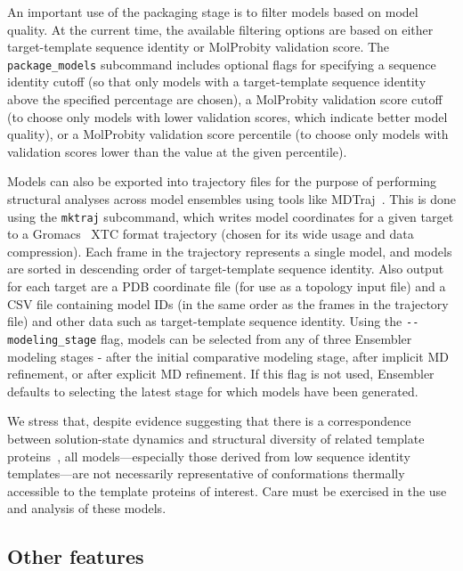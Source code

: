 \documentclass[10pt,letterpaper]{article}
\begin{document}
An important use of the packaging stage is to filter models based on model quality.
At the current time, the available filtering options are based on either target-template sequence identity or MolProbity validation score.
The {\tt package\_models} subcommand includes optional flags for specifying a sequence identity cutoff (so that only models with a target-template sequence identity above the specified percentage are chosen), a MolProbity validation score cutoff (to choose only models with lower validation scores, which indicate better model quality), or a MolProbity validation score percentile (to choose only models with validation scores lower than the value at the given percentile).

Models can also be exported into trajectory files for the purpose of performing structural analyses across model ensembles using tools like MDTraj~\cite{mdtraj}.
This is done using the {\tt mktraj} subcommand, which writes model coordinates for a given target to a Gromacs~\cite{berendsen:1995:gromacs,lindahl:2001:gromacs} XTC format trajectory (chosen for its wide usage and data compression).
Each frame in the trajectory represents a single model, and  models are sorted in descending order of target-template sequence identity.
Also output for each target are a PDB coordinate file (for use as a topology input file) and a CSV file containing model IDs (in the same order as the frames in the trajectory file) and other data such as target-template sequence identity.
Using the {\tt -{}-modeling\_stage} flag, models can be selected from any of three Ensembler modeling stages - after the initial comparative modeling stage, after implicit MD refinement, or after explicit MD refinement.
If this flag is not used, Ensembler defaults to selecting the latest stage for which models have been generated.

We stress that, despite evidence suggesting that there is a correspondence between solution-state dynamics and structural diversity of related template proteins~\cite{friedland:plos-comput-biol:2009:conformational-dynamics}, all models---especially those derived from low sequence identity templates---are not necessarily representative of conformations thermally accessible to the template proteins of interest.
Care must be exercised in the use and analysis of these models.

\subsection*{Other features}
\end{document}
